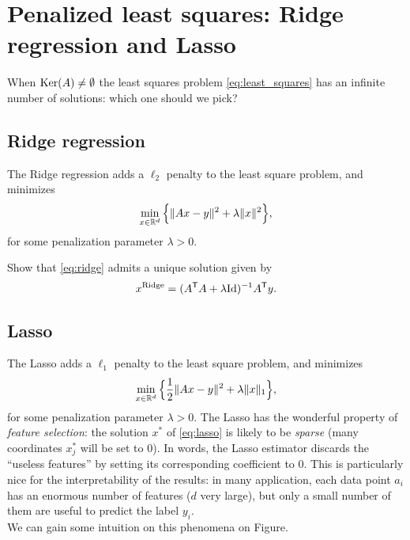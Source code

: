\documentclass[11pt,nocut]{article}
\begin{document}
\section{Penalized least squares: Ridge regression and Lasso}

When ${{\rm Ker}}(A) \neq \emptyset$ the least squares problem \eqref{eq:least_squares} has an infinite number of solutions: which one should we pick?

\subsection{Ridge regression}

The Ridge regression adds a $\ell_2$ penalty to the least square problem, and minimizes
\begin{equation}\label{eq:ridge}
	\min_{x \in \mathbb{R}^d} \Big\{ \| Ax - y \|^2 + \lambda \|x\|^2 \Big\},
\end{equation}
for some penalization parameter $\lambda >0$.
\begin{exercise}
	Show that \eqref{eq:ridge} admits a unique solution given by
	$$
	x^{\rm Ridge} = (A^{{\sf T}} A + \lambda {{\rm Id}})^{-1} A^{{\sf T}} y.
	$$
\end{exercise}

\subsection{Lasso}

The Lasso adds a $\ell_1$ penalty to the least square problem, and minimizes
\begin{equation}\label{eq:lasso}
	\min_{x \in \mathbb{R}^d} \Big\{ \frac{1}{2} \| Ax - y \|^2 + \lambda \|x\|_1 \Big\},
\end{equation}
for some penalization parameter $\lambda >0$.
The Lasso has the wonderful property of \emph{feature selection}: the solution $x^*$ of \eqref{eq:lasso} is likely to be \emph{sparse} (many coordinates $x^*_j$ will be set to $0$).
In words, the Lasso estimator discards the ``useless features'' by setting its corresponding coefficient to $0$. 
This is particularly nice for the interpretability of the results: in many application, each data point $a_i$ has an enormous number of features ($d$ very large), but only a small number of them are useful to predict the label $y_i$.
\\

We can gain some intuition on this phenomena on Figure.

\\
\end{document}
